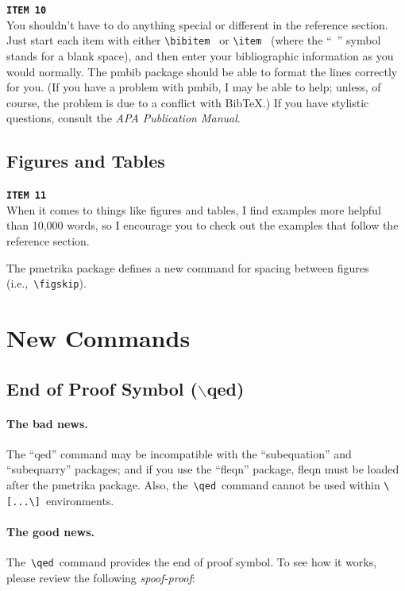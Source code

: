 \documentclass[titlepage,12pt]{article}
\begin{document}
\noindent\texttt{\bf ITEM 10}\\[1.5ex]

You shouldn't have to do anything special or different in the
reference section. Just start each item with either
\verb*=\bibitem = or \verb*=\item = (where the ``\verb*= =''
symbol stands for a blank space), and then enter your
bibliographic information as you would normally. The pmbib package
should be able to format the lines correctly for you. (If you have
a problem with pmbib, I may be able to help; unless, of course,
the problem is due to a conflict with Bib\TeX.) If you have
stylistic questions, consult the \textit{APA Publication Manual}.

\subsection{Figures and Tables}\label{figs}

\noindent\texttt{\bf ITEM 11}\\[1.5ex]

When it comes to things like figures and tables, I find examples
more helpful than 10,000 words, so I encourage you to check out
the examples that follow the reference section.

The pmetrika package defines a new command for spacing between
figures (i.e.,~\verb=\figskip=).

\section{New Commands}

\subsection{End of Proof Symbol (\/$\backslash$qed)}\label{qed}

\paragraph{The bad news.} The ``qed'' command may be
incompatible with the ``subequation'' and ``subeqnarry'' packages;
and if you use the ``fleqn'' package, fleqn must be loaded after
the pmetrika package. Also, the~\verb=\qed=~command cannot be used
within \verb=\[...\]=~environments.

\paragraph{The good news.} The~\verb=\qed=~command provides the end of proof symbol. To
see how it works, please review the following
\textit{spoof-proof}:
\end{document}
